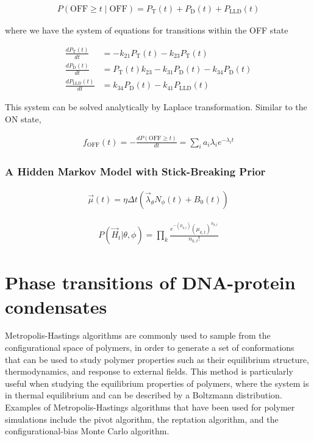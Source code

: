 \documentclass{ucetd}
\begin{document}
\begin{align*}
P(\mathrm{OFF} \geq t\; | \; \mathrm{OFF}) = P_{\mathrm{T}}(t) + P_{\mathrm{D}}(t) + P_{\mathrm{LLD}}(t)
\end{align*}

where we have the system of equations for transitions within the OFF state

\begin{align*}
\frac{dP_{\mathrm{T}}(t)}{dt} &= -k_{21}P_{\mathrm{T}}(t) - k_{23}P_{\mathrm{T}}(t)\\
\frac{dP_{\mathrm{D}}(t)}{dt} &= P_{\mathrm{T}}(t)k_{23}-k_{31}P_{\mathrm{D}}(t) - k_{34}P_{\mathrm{D}}(t)\\
\frac{dP_{\mathrm{LLD}}(t)}{dt} &= k_{34}P_{\mathrm{D}}(t) - k_{41}P_{\mathrm{LLD}}(t)
\end{align*}

This system can be solved analytically by Laplace transformation. Similar to the ON state, 

\begin{align*}
f_{\mathrm{OFF}}(t) = -\frac{dP(\mathrm{OFF} \geq t)}{dt} = \sum_{i}a_{i}\lambda_{i}e^{-\lambda_{i}t}
\end{align*}

\subsection{A Hidden Markov Model with Stick-Breaking Prior}

\begin{align*}
\vec{\mu}(t) = \eta\Delta t\left(\vec{\lambda}_{\theta}N_{\phi}(t) + B_{0}(t)\right)
\end{align*}

\begin{align*}
P(\vec{H}_{t}|\theta,\phi) = \prod_{k} \frac{e^{-\left(\mu_{k,t}\right)}\left(\mu_{k,t}\right)^{n_{k,t}}}{n_{k,t}!}
\end{align*}


\chapter{Phase transitions of DNA-protein condensates}

Metropolis-Hastings algorithms are commonly used to sample from the configurational space of polymers, in order to generate a set of conformations that can be used to study polymer properties such as their equilibrium structure, thermodynamics, and response to external fields. This method is particularly useful when studying the equilibrium properties of polymers, where the system is in thermal equilibrium and can be described by a Boltzmann distribution. Examples of Metropolis-Hastings algorithms that have been used for polymer simulations include the pivot algorithm, the reptation algorithm, and the configurational-bias Monte Carlo algorithm.
\end{document}
